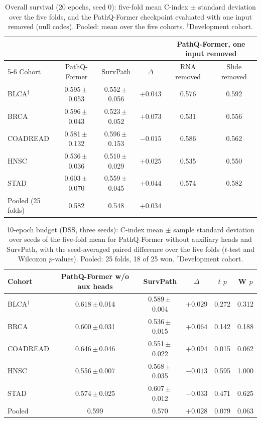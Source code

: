 \documentclass{article}
\newcommand{\pq}{PathQ-Former}
\newcommand{\cindex}{C-index}
\newcommand{\pmv}[2]{#1\,$\pm$\,#2}
\begin{document}
\begin{table}[htbp]
\caption{Overall survival (20 epochs, seed 0): five-fold mean \cindex{} $\pm$ standard deviation over the five folds, and the \pq{} checkpoint evaluated with one input removed (null codes). Pooled: mean over the five cohorts. $^\dagger$Development cohort.}
\label{tab:os}
\centering
\small
\begin{tabular}{@{}lccccc@{}}
\toprule
 & & & & \multicolumn{2}{c}{\pq{}, one input removed} \\
\cmidrule(lr){5-6}
Cohort & \pq{} & SurvPath & $\Delta$ & RNA removed & Slide removed \\
\midrule
BLCA$^\dagger$ & \pmv{0.595}{0.053} & \pmv{0.552}{0.056} & $+0.043$ & 0.576 & 0.592 \\
BRCA & \pmv{0.596}{0.043} & \pmv{0.523}{0.052} & $+0.073$ & 0.531 & 0.556 \\
COADREAD & \pmv{0.581}{0.132} & \pmv{0.596}{0.153} & $-0.015$ & 0.586 & 0.562 \\
HNSC & \pmv{0.536}{0.036} & \pmv{0.510}{0.029} & $+0.025$ & 0.535 & 0.550 \\
STAD & \pmv{0.603}{0.070} & \pmv{0.559}{0.045} & $+0.044$ & 0.574 & 0.582 \\
\midrule
Pooled (25 folds) & 0.582 & 0.548 & $+0.034$ & & \\
\bottomrule
\end{tabular}
\end{table}

\begin{table}[htbp]
\caption{10-epoch budget (DSS, three seeds): \cindex{} mean $\pm$ sample standard deviation over seeds of the five-fold mean for \pq{} without auxiliary heads and SurvPath, with the seed-averaged paired difference over the five folds ($t$-test and Wilcoxon $p$-values). Pooled: 25 folds, 18 of 25 won. $^\dagger$Development cohort.}
\label{tab:e10}
\centering
\small
\begin{tabular}{@{}lccccc@{}}
\toprule
Cohort & \pq{} w/o aux heads & SurvPath & $\Delta$ & $t$ $p$ & W $p$ \\
\midrule
BLCA$^\dagger$ & \pmv{0.618}{0.014} & \pmv{0.589}{0.004} & $+0.029$ & 0.272 & 0.312 \\
BRCA & \pmv{0.600}{0.031} & \pmv{0.536}{0.015} & $+0.064$ & 0.142 & 0.188 \\
COADREAD & \pmv{0.646}{0.046} & \pmv{0.551}{0.022} & $+0.094$ & 0.015 & 0.062 \\
HNSC & \pmv{0.556}{0.007} & \pmv{0.568}{0.035} & $-0.013$ & 0.595 & 1.000 \\
STAD & \pmv{0.574}{0.025} & \pmv{0.607}{0.012} & $-0.033$ & 0.471 & 0.625 \\
\midrule
Pooled & 0.599 & 0.570 & $+0.028$ & 0.079 & 0.063 \\
\bottomrule
\end{tabular}
\end{table}
\end{document}
